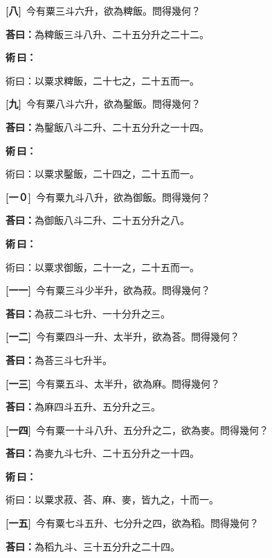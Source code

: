\documentclass[11pt,a4paper]{article}
\newenvironment{method}{%
  \par\noindent\textcolor{methodcolor}{\textbf{術\,曰：}}%
  \ignorespaces
}{\par\vspace{0.5em}}
\newcommand{\problemnum}[1]{\textbf{[\ignorespaces#1\unskip]}}
\begin{document}
\noindent\problemnum{八}\,
今有粟三斗六升，欲為粺飯。問得幾何？

\noindent\textcolor{answercolor}{\textbf{荅曰：}}為粺飯三斗八升、二十五分升之二十二。

\begin{method}
術曰：以粟求粺飯，二十七之，二十五而一。
\end{method}

\noindent\problemnum{九}\,
今有粟八斗六升，欲為鑿飯。問得幾何？

\noindent\textcolor{answercolor}{\textbf{荅曰：}}為鑿飯八斗二升、二十五分升之一十四。

\begin{method}
術曰：以粟求鑿飯，二十四之，二十五而一。
\end{method}

\noindent\problemnum{一０}\,
今有粟九斗八升，欲為御飯。問得幾何？

\noindent\textcolor{answercolor}{\textbf{荅曰：}}為御飯八斗二升、二十五分升之八。

\begin{method}
術曰：以粟求御飯，二十一之，二十五而一。
\end{method}

\noindent\problemnum{一一}\,
今有粟三斗少半升，欲為菽。問得幾何？

\noindent\textcolor{answercolor}{\textbf{荅曰：}}為菽二斗七升、一十分升之三。

\noindent\problemnum{一二}\,
今有粟四斗一升、太半升，欲為荅。問得幾何？

\noindent\textcolor{answercolor}{\textbf{荅曰：}}為荅三斗七升半。

\noindent\problemnum{一三}\,
今有粟五斗、太半升，欲為麻。問得幾何？

\noindent\textcolor{answercolor}{\textbf{荅曰：}}為麻四斗五升、五分升之三。

\noindent\problemnum{一四}\,
今有粟一十斗八升、五分升之二，欲為麥。問得幾何？

\noindent\textcolor{answercolor}{\textbf{荅曰：}}為麥九斗七升、二十五分升之一十四。

\begin{method}
術曰：以粟求菽、荅、麻、麥，皆九之，十而一。
\end{method}

\noindent\problemnum{一五}\,
今有粟七斗五升、七分升之四，欲為稻。問得幾何？

\noindent\textcolor{answercolor}{\textbf{荅曰：}}為稻九斗、三十五分升之二十四。
\end{document}
